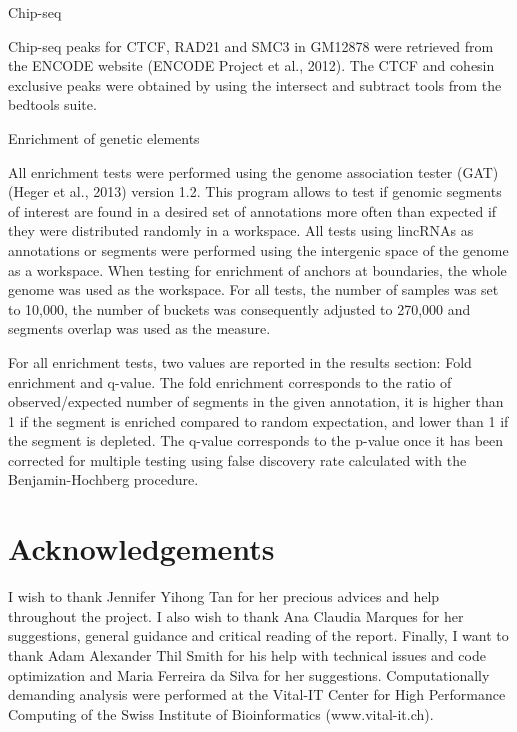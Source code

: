 \documentclass[11pt,a4paper]{report}
\begin{document}
Chip-seq

Chip-seq peaks for CTCF, RAD21 and SMC3 in GM12878 were retrieved from the ENCODE website (ENCODE Project et al., 2012)⁠. The CTCF and cohesin exclusive peaks were obtained by using the intersect and subtract tools from the bedtools suite.


Enrichment of genetic elements

All enrichment tests were performed using the genome association tester (GAT) (Heger et al., 2013)⁠ version 1.2. This program allows to test if genomic segments of interest are found in a desired set of annotations more often than expected if they were distributed randomly in a workspace. All tests using lincRNAs as annotations or segments were performed using the intergenic space of the genome as a workspace. When testing for enrichment of anchors at boundaries, the whole genome was used as the workspace. For all tests, the number of samples was set to 10,000, the number of buckets was consequently adjusted to 270,000 and segments overlap was used as the measure.

For all enrichment tests, two values are reported in the results section: Fold enrichment and q-value. The fold enrichment corresponds to the ratio of observed/expected number of segments in the given annotation, it is higher than 1 if the segment is enriched compared to random expectation, and lower than 1 if the segment is depleted. The q-value corresponds to the p-value once it has been corrected for multiple testing using false discovery rate calculated with the Benjamin-Hochberg procedure.
\section*{Acknowledgements}
I wish to thank Jennifer Yihong Tan for her precious advices and help throughout the project. I also wish to thank Ana Claudia Marques for her suggestions, general guidance and critical reading of the report. Finally, I want to thank Adam Alexander Thil Smith for  his help with technical issues and code optimization and Maria Ferreira da Silva for her suggestions.
Computationally demanding analysis were performed at the Vital-IT Center for High Performance Computing of the Swiss Institute of Bioinformatics (www.vital-it.ch).


\fancyhead[L]{\slshape }

\end{document}
